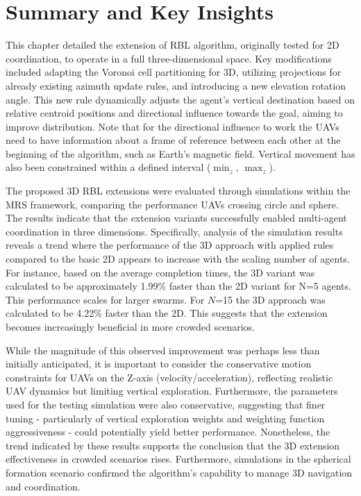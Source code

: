     \section{Summary and Key Insights}
        This chapter detailed the extension of \ac{RBL} algorithm, originally tested for 2D coordination, to operate in a full three-dimensional space.
        Key modifications included adapting the Voronoi cell partitioning for 3D, utilizing projections for already existing azimuth update rules, and introducing a new elevation rotation angle.
        This new rule dynamically adjusts the agent's vertical destination based on relative centroid positions and directional influence towards the goal, aiming to improve distribution.
        Note that for the directional influence to work the \ac{UAV}s need to have information about a frame of reference between each other at the beginning of the algorithm, such as Earth's magnetic field.
        Vertical movement has also been constrained within a defined interval ($\min_z$, $\max_z$).

        The proposed 3D RBL extensions were evaluated through simulations within the \ac{MRS} framework, comparing the performance \ac{UAV}s crossing circle and sphere. 
        The results indicate that the extension variants successfully enabled multi-agent coordination in three dimensions.
        Specifically, analysis of the simulation results reveals a trend where the performance of the 3D approach with applied rules compared to the basic 2D appears to increase with the scaling number of agents. 
        For instance, based on the average completion times, the 3D variant was calculated to be approximately 1.99\% faster than the 2D variant for N=5 agents.
        This performance scales for larger swarms.
        For $N$=15 the 3D approach was calculated to be 4.22\% faster than the 2D.
        This suggests that the extension becomes increasingly beneficial in more crowded scenarios.

        While the magnitude of this observed improvement was perhaps less than initially anticipated, it is important to consider the conservative motion constraints for \ac{UAV}s on the Z-axis (velocity/acceleration), reflecting realistic \ac{UAV} dynamics but limiting vertical exploration.
        Furthermore, the parameters used for the testing simulation were also conservative, suggesting that finer tuning - particularly of vertical exploration weights and weighting function aggressiveness - could potentially yield better performance.
        Nonetheless, the trend indicated by these results supports the conclusion that the 3D extension effectiveness in crowded scenarios rises.
        Furthermore, simulations in the spherical formation scenario confirmed the algorithm's capability to manage 3D navigation and coordination.

